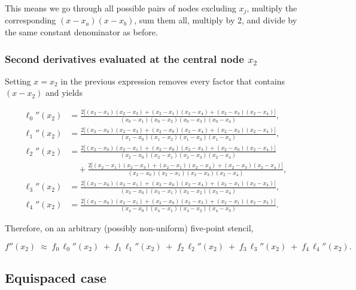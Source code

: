 This means we go through all possible pairs of nodes excluding \(x_j\), multiply the corresponding \((x - x_a)(x - x_b)\), sum them all, multiply by 2, and divide by the same constant denominator as before.

\vspace{1em}

\subsubsection*{Second derivatives evaluated at the central node $x_2$}

Setting $x=x_2$ in the previous expression removes every factor that
contains $(x-x_2)$ and yields

\[
\begin{aligned}
\ell_0''(x_2) &=
\frac{2\bigl[(x_2-x_1)(x_2-x_3)
            +(x_2-x_1)(x_2-x_4)
            +(x_2-x_3)(x_2-x_4)\bigr]}
     {(x_0-x_1)(x_0-x_2)(x_0-x_3)(x_0-x_4)},\\[1.2ex]
%
\ell_1''(x_2) &=
\frac{2\bigl[(x_2-x_0)(x_2-x_3)
            +(x_2-x_0)(x_2-x_4)
            +(x_2-x_3)(x_2-x_4)\bigr]}
     {(x_1-x_0)(x_1-x_2)(x_1-x_3)(x_1-x_4)},\\[1.2ex]
%
\ell_2''(x_2) &=
\frac{2\bigl[(x_2-x_0)(x_2-x_1)
            +(x_2-x_0)(x_2-x_3)
            +(x_2-x_0)(x_2-x_4)\bigr]}     %
     {(x_2-x_0)(x_2-x_1)(x_2-x_3)(x_2-x_4)} \\[0.5ex]
&\quad
+\frac{2\bigl[(x_2-x_1)(x_2-x_3)
            +(x_2-x_1)(x_2-x_4)
            +(x_2-x_3)(x_2-x_4)\bigr]}
     {(x_2-x_0)(x_2-x_1)(x_2-x_3)(x_2-x_4)},\\[2.0ex]%
\ell_3''(x_2) &=
\frac{2\bigl[(x_2-x_0)(x_2-x_1)
            +(x_2-x_0)(x_2-x_4)
            +(x_2-x_1)(x_2-x_4)\bigr]}
     {(x_3-x_0)(x_3-x_1)(x_3-x_2)(x_3-x_4)},\\[1.2ex]
%
\ell_4''(x_2) &=
\frac{2\bigl[(x_2-x_0)(x_2-x_1)
            +(x_2-x_0)(x_2-x_3)
            +(x_2-x_1)(x_2-x_3)\bigr]}
     {(x_4-x_0)(x_4-x_1)(x_4-x_2)(x_4-x_3)}.
\end{aligned}
\]

Therefore, on an arbitrary (possibly non-uniform) five-point stencil,

\[
f''(x_2)\;\approx\;
f_0\,\ell_0''(x_2) \;+\;
f_1\,\ell_1''(x_2) \;+\;
f_2\,\ell_2''(x_2) \;+\;
f_3\,\ell_3''(x_2) \;+\;
f_4\,\ell_4''(x_2).
\]

\vspace{1em}

\subsection{Equispaced case}


